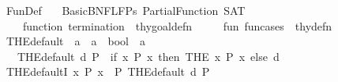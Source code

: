 %
\begin{isabellebody}%
%
%
\isadelimdocument
%
\endisadelimdocument
%
\isatagdocument
%
\isamarkuptrue%
%
\endisatagdocument
{\isafolddocument}%
%
\isadelimdocument
%
\endisadelimdocument
%
\isadelimtheory
%
\endisadelimtheory
%
\isatagtheory
{}\isamarkupfalse%
\ Fun{\isacharunderscore}{\kern0pt}Def\isanewline
\ \ \ Basic{\isacharunderscore}{\kern0pt}BNF{\isacharunderscore}{\kern0pt}LFPs\ Partial{\isacharunderscore}{\kern0pt}Function\ SAT\isanewline
\ \ \isanewline
\ \ \ \ {\isachardoublequoteopen}function{\isachardoublequoteclose}\ {\isachardoublequoteopen}termination{\isachardoublequoteclose}\ {\isacharcolon}{\kern0pt}{\isacharcolon}{\kern0pt}\ thy{\isacharunderscore}{\kern0pt}goal{\isacharunderscore}{\kern0pt}defn\ \isanewline
\ \ \ \ {\isachardoublequoteopen}fun{\isachardoublequoteclose}\ {\isachardoublequoteopen}fun{\isacharunderscore}{\kern0pt}cases{\isachardoublequoteclose}\ {\isacharcolon}{\kern0pt}{\isacharcolon}{\kern0pt}\ thy{\isacharunderscore}{\kern0pt}defn\isanewline
{}%
\endisatagtheory
{\isafoldtheory}%
%
\isadelimtheory
%
\endisadelimtheory
%
\isadelimdocument
%
\endisadelimdocument
%
\isatagdocument
%
\isamarkuptrue%
%
\endisatagdocument
{\isafolddocument}%
%
\isadelimdocument
%
\endisadelimdocument
{}\isamarkupfalse%
\ THE{\isacharunderscore}{\kern0pt}default\ {\isacharcolon}{\kern0pt}{\isacharcolon}{\kern0pt}\ {\isachardoublequoteopen}{\isacharprime}{\kern0pt}a\ {\isasymRightarrow}\ {\isacharparenleft}{\kern0pt}{\isacharprime}{\kern0pt}a\ {\isasymRightarrow}\ bool{\isacharparenright}{\kern0pt}\ {\isasymRightarrow}\ {\isacharprime}{\kern0pt}a{\isachardoublequoteclose}\isanewline
\ \ \ {\isachardoublequoteopen}THE{\isacharunderscore}{\kern0pt}default\ d\ P\ {\isacharequal}{\kern0pt}\ {\isacharparenleft}{\kern0pt}if\ {\isacharparenleft}{\kern0pt}{\isasymexists}{\isacharbang}{\kern0pt}x{\isachardot}{\kern0pt}\ P\ x{\isacharparenright}{\kern0pt}\ then\ {\isacharparenleft}{\kern0pt}THE\ x{\isachardot}{\kern0pt}\ P\ x{\isacharparenright}{\kern0pt}\ else\ d{\isacharparenright}{\kern0pt}{\isachardoublequoteclose}\isanewline
\isanewline
{}\isamarkupfalse%
\ THE{\isacharunderscore}{\kern0pt}defaultI{\isacharprime}{\kern0pt}{\isacharcolon}{\kern0pt}\ {\isachardoublequoteopen}{\isasymexists}{\isacharbang}{\kern0pt}x{\isachardot}{\kern0pt}\ P\ x\ {\isasymLongrightarrow}\ P\ {\isacharparenleft}{\kern0pt}THE{\isacharunderscore}{\kern0pt}default\ d\ P{\isacharparenright}{\kern0pt}{\isachardoublequoteclose}\isanewline

\end{isabellebody}
